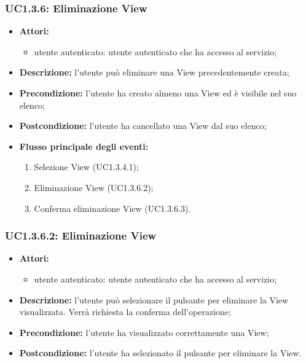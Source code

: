 \subsubsection{UC1.3.6: Eliminazione View}

\begin{itemize}
	\item \textbf{Attori:}
	\begin{itemize}
		\item utente autenticato: utente autenticato che ha accesso al servizio;
	\end{itemize}
	\item \textbf{Descrizione:} l'utente può eliminare una View precedentemente creata;
	\item \textbf{Precondizione:} l'utente ha creato almeno una View ed è visibile nel suo elenco;
	\item \textbf{Postcondizione:} l'utente ha cancellato una View dal suo elenco;
	\item \textbf{Flusso principale degli eventi:}
	\begin{enumerate}
		\item Selezione View (UC1.3.4.1);
		\item Eliminazione View (UC1.3.6.2);
		\item Conferma eliminazione View (UC1.3.6.3).
	\end{enumerate}
\end{itemize}

\subsubsection{UC1.3.6.2: Eliminazione View}

\begin{itemize}
	\item \textbf{Attori:}
	\begin{itemize}
		\item utente autenticato: utente autenticato che ha accesso al servizio;
	\end{itemize}
	\item \textbf{Descrizione:} l'utente può selezionare il pulsante per eliminare la View visualizzata. Verrà richiesta la conferma dell'operazione;
	\item \textbf{Precondizione:} l'utente ha visualizzato correttamente una View;
	\item \textbf{Postcondizione:} l'utente ha selezionato il pulsante per eliminare la View.
\end{itemize}

